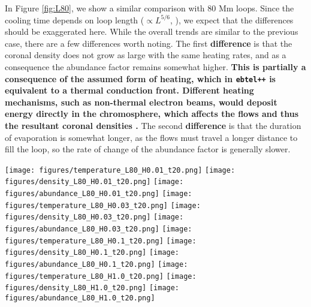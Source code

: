 \documentclass[twocolumn]{aastex631}
\begin{document}
In Figure \ref{fig:L80}, we show a similar comparison with 80 Mm loops.  Since the cooling time depends on loop length ($\propto L^{5/6}$, \citealt{cargill1995}), we expect that the differences should be exaggerated here.  While the overall trends are similar to the previous case, there are a few differences worth noting.  The first \textbf{difference} is that the coronal density does not grow as large with the same heating rates, and as a consequence the abundance factor remains somewhat higher.  \textbf{This is partially a consequence of the assumed form of heating, which in \texttt{ebtel++} is equivalent to a thermal conduction front.  Different heating mechanisms, such as non-thermal electron beams, would deposit energy directly in the chromosphere, which affects the flows and thus the resultant coronal densities \citep{fisher1984,allred2005,reep2015}.}  The second \textbf{difference} is that the duration of evaporation is somewhat longer, as the flows must travel a longer distance to fill the loop, so the rate of change of the abundance factor is generally slower.  
\begin{figure*}
    \centering
    \texttt{[image: figures/temperature\_L80\_H0.01\_t20.png]}
    \texttt{[image: figures/density\_L80\_H0.01\_t20.png]}
    \texttt{[image: figures/abundance\_L80\_H0.01\_t20.png]}
    \texttt{[image: figures/temperature\_L80\_H0.03\_t20.png]}
    \texttt{[image: figures/density\_L80\_H0.03\_t20.png]}
    \texttt{[image: figures/abundance\_L80\_H0.03\_t20.png]}
    \texttt{[image: figures/temperature\_L80\_H0.1\_t20.png]}
    \texttt{[image: figures/density\_L80\_H0.1\_t20.png]}
    \texttt{[image: figures/abundance\_L80\_H0.1\_t20.png]}
    \texttt{[image: figures/temperature\_L80\_H1.0\_t20.png]}
    \texttt{[image: figures/density\_L80\_H1.0\_t20.png]}
    \texttt{[image: figures/abundance\_L80\_H1.0\_t20.png]}
    \caption{Similar to Figure \ref{fig:L40}, showing the results for an 80 Mm loop heated impulsively for 20 s.  \label{fig:L80}}
\end{figure*}
\end{document}
